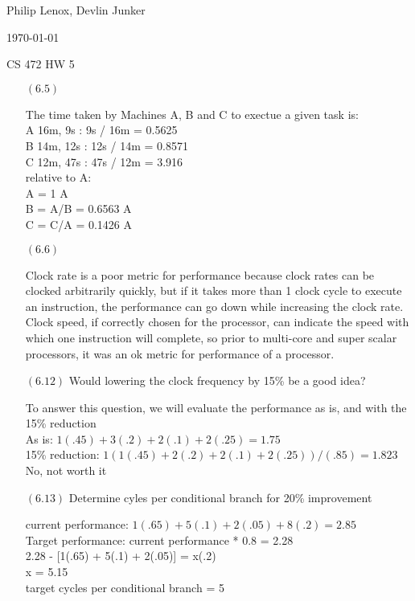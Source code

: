\documentclass[letterpaper,10pt,titlepage]{article}
\def\name{Philip Lenox, Devlin Junker}
\begin{document}
\hfill \name

\hfill \today

\hfill CS 472 HW 5

\begin{enumerate}

\item[$(6.5)$]

The time taken by Machines A, B and C to exectue a given task is:\\
A 16m, 9s : 9s / 16m = 0.5625\\
B 14m, 12s : 12s / 14m = 0.8571\\
C 12m, 47s : 47s / 12m = 3.916\\
relative to A:\\
A = 1 A\\
B = A/B = 0.6563 A\\
C = C/A = 0.1426 A \\

\item[$(6.6)$] 

Clock rate is a poor metric for performance because clock rates can be clocked arbitrarily quickly, but if it takes more than 1 clock cycle to execute an instruction, the performance can go down while increasing the clock rate. Clock speed, if correctly chosen for the processor, can indicate the speed with which one instruction will complete, so prior to multi-core and super scalar processors, it was an ok metric for performance of a processor. 

\item[$(6.12)$] Would lowering the clock frequency by 15\% be a good idea?

To answer this question, we will evaluate the performance as is, and with the 15\% reduction \\
As is: $1(.45) + 3(.2) + 2(.1) + 2(.25) = 1.75$ \\
15\% reduction: $1(1(.45) + 2(.2) + 2(.1) + 2(.25))/(.85) = 1.823$\\
No, not worth it

\item[$(6.13)$] Determine cyles per conditional branch for 20\% improvement

current performance: $1(.65) + 5(.1) + 2(.05) + 8(.2) = 2.85 $\\
Target performance: current performance * 0.8 = 2.28 \\
2.28 - [1(.65) + 5(.1) + 2(.05)] = x(.2) \\
x = 5.15 \\
target cycles per conditional branch = 5\\


\end{enumerate}
\end{document}
